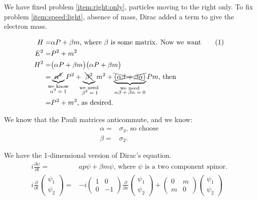 \documentclass[]{article}
\newcommand\numberthis{\addtocounter{equation}{1}\tag{\theequation}}
\begin{document}
We have fixed problem \ref{item:right:only}, particles moving to the right only. To fix problem \ref{item:speed:light}, absence of mass, Dirac added a term to give the electron mass. 

\begin{align*}
	H =& \alpha P + \beta m \text{, where $\beta$ is some matrix. Now we want} \numberthis \label{eq:dirac:1D:m}\\
	E^2 =& P^2 + m^2\\
	H^2=& \big(\alpha P + \beta m \big) \big(\alpha P + \beta m \big) \\
	=& \underbrace{\cancel{\alpha^2}}_{\mathclap{\substack{\text{we know}\\
		\text{$\alpha^2=1$}}}} P^2 + \underbrace{\bcancel{\beta^2} }_{\mathclap{\substack{\text{we need}\\
	\text{ $\beta^2=1$}}}} m^2 + \underbrace{\xcancel{(\alpha \beta + \beta \alpha)}}_{\mathclap{\substack{\text{we  need}\\
	\text{$\alpha \beta + \beta \alpha=0$}}}} P m \text{, then}\\
	=&  P^2 + m^2 	\text{, as desired.} 
\end{align*}

We know that the Pauli matrices anticommute, and we know:
\begin{align*}
	\alpha =& \sigma_3 \text{, so choose}\\
	\beta=& \sigma_2.
\end{align*}

We have the 1-dimensional version of Dirac's equation.
\begin{align*}
	i \frac{\partial \psi}{\partial t}=& a p \psi + \beta m \psi \text{, where $\psi$ is a two component spinor.}\\
	i \frac{\partial}{\partial t}\begin{pmatrix}
	\psi_1\\
	\psi_2
	\end{pmatrix}=&-i \begin{pmatrix}
	1&0\\
	0&-1
	\end{pmatrix} \frac{\partial}{\partial x}\begin{pmatrix}
	\psi_1\\
	\psi_2
	\end{pmatrix} + \begin{pmatrix}
	0&m\\
	m&0
	\end{pmatrix}\begin{pmatrix}
	\psi_1\\
	\psi_2
	\end{pmatrix}
\end{align*}
\end{document}
